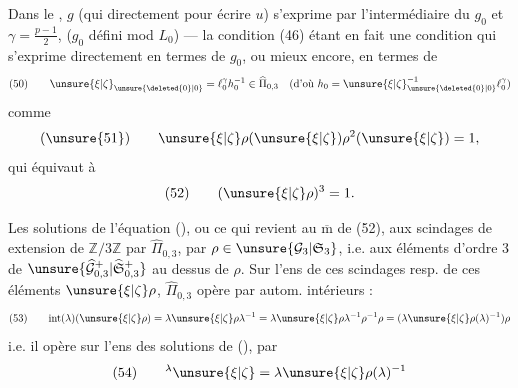 
\uline{} Dans le ,  $g$  (qui  directement pour écrire $u$) s'exprime par l'intermédiaire du $g_0$  et $\gamma=\frac{p-1}{2}$,  ($g_0$ défini mod $L_0$) --- la condition (46) étant en fait une condition qui s'exprime directement en termes de $g_0$, ou mieux encore, en termes de
\[
(50)\qquad
\unsure{\xi|\zeta}_{\unsure{\deleted{0}|0}}=\ell_0^\gamma h_0^{-1}\in\widehat{\Pi}_{0,3}
\quad\text{(d'où }h_0=\unsure{\xi|\zeta}_{\unsure{\deleted{0}|0}}^{-1}\ell_0^\gamma\text{)}
\]
comme
\[
(\unsure{51})\qquad \unsure{\xi|\zeta}\rho(\unsure{\xi|\zeta})\rho^2(\unsure{\xi|\zeta})=1,
\]
qui équivaut à
\[
(52)\qquad (\unsure{\xi|\zeta}\rho)^3=1.
\]

Les solutions de l'équation (), ou ce qui revient au $\overline{\mathrm m}$ de (52),  aux scindages de extension  de $\mathbb Z/3\mathbb Z$ par $\widehat{\Pi}_{0,3}$,  par $\rho\in\unsure{\mathcal G_3|\mathfrak S_3}$,  i.e. aux éléments d'ordre 3 de $\unsure{\widehat{\mathcal G}_{0,3}^{+}|\widehat{\mathfrak S}_{0,3}^{+}}$ au dessus de $\rho$.
Sur l'ens de ces scindages resp. de ces éléments $\unsure{\xi|\zeta}\rho$, $\widehat{\Pi}_{0,3}$ opère par autom. intérieurs :
\[
(53)\qquad
\mathrm{int}(\lambda)(\unsure{\xi|\zeta}\rho)
=\lambda\unsure{\xi|\zeta}\rho\lambda^{-1}
=\lambda\unsure{\xi|\zeta}\rho\lambda^{-1}\rho^{-1}\rho
=(\lambda\unsure{\xi|\zeta}\rho(\lambda)^{-1})\rho
\]
i.e. il opère sur l'ens des solutions de (), par
\[
(54)\qquad {}^\lambda\unsure{\xi|\zeta}=\lambda\unsure{\xi|\zeta}\rho(\lambda)^{-1}
\]


